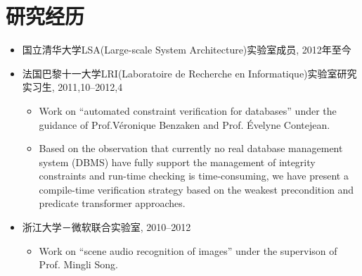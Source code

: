 \documentclass[letterpaper]{article}
\begin{document}

\section*{研究经历}

\begin{itemize}
\item 国立清华大学LSA(Large-scale System Architecture)实验室成员, 2012年至今
\item 法国巴黎十一大学LRI(Laboratoire de Recherche en Informatique)实验室研究实习生, 2011,10--2012,4
    \begin{itemize}
	  \item Work on ``automated constraint verification for databases'' under the guidance of Prof.V\'eronique Benzaken and Prof. \'Evelyne Contejean.
	  \item Based on the observation that currently no real database management system (DBMS) have fully support the management of integrity constraints and run-time checking is time-consuming, we have present a compile-time verification strategy based on the weakest precondition and predicate transformer approaches.
    \end{itemize} 
\item 浙江大学－微软联合实验室, 2010--2012
    \begin{itemize}
	  \item Work on ``scene audio recognition of images'' under the supervison of Prof. Mingli Song. 



\end{itemize}
\end{itemize}
\end{document}
